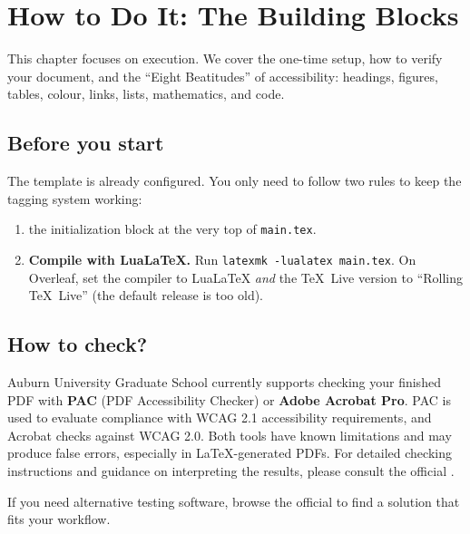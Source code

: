 \chapter{How to Do It: The Building Blocks}
\label{chap:blocks}

This chapter focuses on execution. We cover the one-time setup, how to verify your document, and the \enquote{Eight Beatitudes} of accessibility: headings, figures, tables, colour, links, lists, mathematics, and code.

\section{Before you start}
\label{sec:setup}

The template is already configured. You only need to follow two rules to keep the tagging system working:

\begin{enumerate}
  \item {} the initialization block at the very top of \texttt{main.tex}.
  \item \textbf{Compile with LuaLaTeX.} Run \texttt{latexmk -lualatex main.tex}. On Overleaf, set the compiler to LuaLaTeX \emph{and} the TeX~Live version to \enquote{Rolling TeX~Live} (the default release is too old).
\end{enumerate}

\section{How to check?}
\label{sec:verify}

Auburn University Graduate School currently supports checking your finished PDF with \textbf{PAC} (PDF Accessibility Checker) or \textbf{Adobe Acrobat Pro}. PAC is used to evaluate compliance with WCAG 2.1 accessibility requirements, and Acrobat checks against WCAG 2.0. Both tools have known limitations and may produce false errors, especially in LaTeX-generated PDFs. For detailed checking instructions and guidance on interpreting the results, please consult the official .


If you need alternative testing software, browse the official  to find a solution that fits your workflow.

